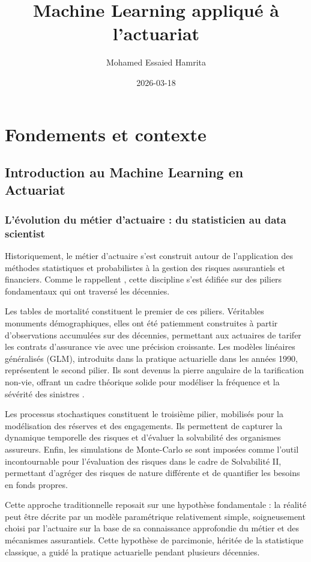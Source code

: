 \documentclass[
  french,
]{book}
\title{Machine Learning appliqué à l'actuariat}
\author{Mohamed Essaied Hamrita}
\date{2026-03-18}
\theoremstyle{definition}
\theoremstyle{definition}
\theoremstyle{definition}
\theoremstyle{definition}
\theoremstyle{remark}
\begin{document}
\maketitle

{
\hypersetup{linkcolor=}
\setcounter{tocdepth}{1}
\tableofcontents
}
\chapter{Fondements et contexte}

\section{Introduction au Machine Learning en Actuariat}

\subsection{L'évolution du métier d'actuaire : du statisticien au data scientist}

Historiquement, le métier d'actuaire s'est construit autour de l'application des méthodes statistiques et probabilistes à la gestion des risques assurantiels et financiers. Comme le rappellent \citet{denuit2019effective}, cette discipline s'est édifiée sur des piliers fondamentaux qui ont traversé les décennies.

Les tables de mortalité constituent le premier de ces piliers. Véritables monuments démographiques, elles ont été patiemment construites à partir d'observations accumulées sur des décennies, permettant aux actuaires de tarifer les contrats d'assurance vie avec une précision croissante. Les modèles linéaires généralisés (GLM), introduits dans la pratique actuarielle dans les années 1990, représentent le second pilier. Ils sont devenus la pierre angulaire de la tarification non-vie, offrant un cadre théorique solide pour modéliser la fréquence et la sévérité des sinistres \citet{frees2014predictive}.

Les processus stochastiques constituent le troisième pilier, mobilisés pour la modélisation des réserves et des engagements. Ils permettent de capturer la dynamique temporelle des risques et d'évaluer la solvabilité des organismes assureurs. Enfin, les simulations de Monte-Carlo se sont imposées comme l'outil incontournable pour l'évaluation des risques dans le cadre de Solvabilité II, permettant d'agréger des risques de nature différente et de quantifier les besoins en fonds propres.

Cette approche traditionnelle reposait sur une hypothèse fondamentale : la réalité peut être décrite par un modèle paramétrique relativement simple, soigneusement choisi par l'actuaire sur la base de sa connaissance approfondie du métier et des mécanismes assurantiels. Cette hypothèse de parcimonie, héritée de la statistique classique, a guidé la pratique actuarielle pendant plusieurs décennies.
\end{document}
